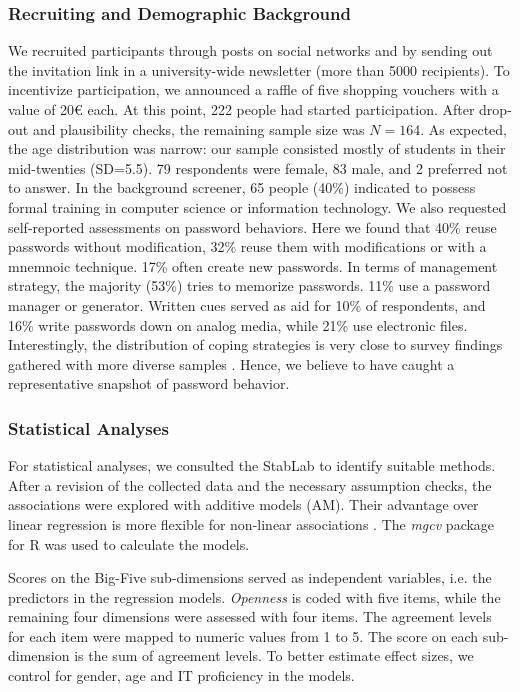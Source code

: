 \subsubsection{Recruiting and Demographic Background}
We recruited participants through posts on social networks and by sending out the invitation link in a university-wide newsletter (more than 5000 recipients). To incentivize participation, we announced a raffle of five shopping vouchers with a value of 20€ each. At this point, 222 people had started participation. After drop-out and plausibility checks, the remaining sample size was $N=164$. As expected, the age distribution was narrow: our sample consisted mostly of students in their mid-twenties  (SD=5.5). 79 respondents were female, 83 male, and 2 preferred not to answer. In the background screener, 65 people (40\%) indicated to possess formal training in computer science or information technology. We also requested self-reported assessments on password behaviors. Here we found that 40\% reuse passwords without modification, 32\% reuse them with modifications or with a mnemnoic technique. 17\% often create new passwords. In terms of management strategy, the majority (53\%) tries to memorize passwords. 11\% use a password manager or generator. Written cues served as aid for 10\% of respondents, and 16\% write passwords down on analog media, while 21\% use electronic files. Interestingly, the distribution of coping strategies is very close to survey findings gathered with more diverse samples \cite{CSID2012PasswordHabits}. Hence, we believe to have caught a representative snapshot of password behavior.

\subsubsection{Statistical Analyses}
For statistical analyses, we consulted the StabLab to identify suitable methods. After a revision of the collected data and the necessary assumption checks, the associations were explored with additive models (AM). Their advantage over linear regression is more flexible for non-linear associations . The \textit{mgcv} package for R was used to calculate the models.

Scores on the Big-Five sub-dimensions served as independent variables, i.e. the predictors in the regression models. \textit{Openness} is coded with five items, while the remaining four dimensions were assessed with four items. The agreement levels for each item were mapped to numeric values from 1 to 5. The score on each sub-dimension is the sum of agreement levels. To better estimate effect sizes, we control for gender, age and IT proficiency in the models. 
